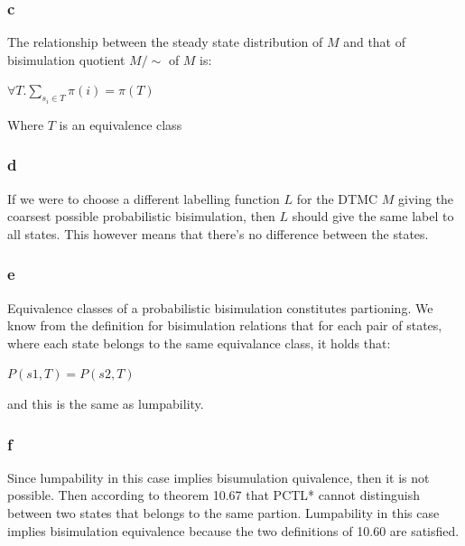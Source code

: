 \subsubsection{c}
The relationship between the steady state distribution of $M$ and that of bisimulation quotient $M/\sim$ of $M$ is:

$\forall T. \sum_{s_i \in T} \pi(i)=\pi(T)$

Where $T$ is an equivalence class

\subsubsection{d}
If we were to choose a different labelling function $L$ for the DTMC $M$ giving the coarsest possible probabilistic bisimulation, then $L$ should give the same label to all states.
This however means that there's no difference between the states.

\subsubsection{e}
Equivalence classes of a probabilistic bisimulation constitutes partioning. We know from the definition for bisimulation relations that for each pair of states, where each state belongs to the same
equivalance class, it holds that:

$P(s1,T)=P(s2,T)$

and this is the same as lumpability.

\subsubsection{f}
Since lumpability in this case implies bisumulation quivalence, then it is not possible. Then according to theorem 10.67 that PCTL* cannot distinguish between two states that belongs to the same partion.
Lumpability in this case implies bisimulation equivalence because the two definitions of 10.60 are satisfied.

